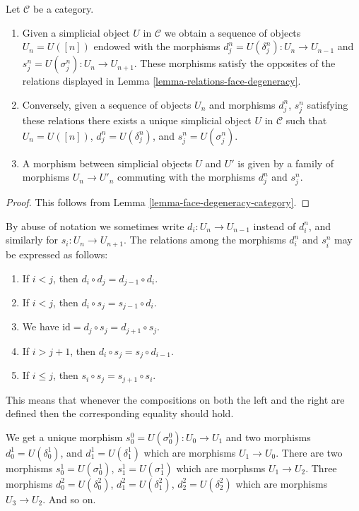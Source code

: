 \begin{lemma}
\label{lemma-characterize-simplicial-object}
Let $\mathcal{C}$ be a category.
\begin{enumerate}
\item Given a simplicial object $U$ in $\mathcal{C}$
we obtain a sequence of objects $U_n = U([n])$ endowed
with the morphisms $d^n_j = U(\delta^n_j) : U_n \to U_{n-1}$ and
$s^n_j = U(\sigma^n_j) : U_n \to U_{n + 1}$. These morphisms
satisfy the opposites of the relations displayed in
Lemma \ref{lemma-relations-face-degeneracy}.
\item Conversely, given a sequence of objects $U_n$ and morphisms
$d^n_j$, $s^n_j$ satisfying these relations there exists a unique
simplicial object $U$ in $\mathcal{C}$ such that $U_n = U([n])$,
$d^n_j = U(\delta^n_j)$, and $s^n_j = U(\sigma^n_j)$.
\item A morphism between simplicial objects $U$ and $U'$
is given by a family of morphisms $U_n \to U'_n$ commuting
with the morphisms $d^n_j$ and $s^n_j$.
\end{enumerate}
\end{lemma}

\begin{proof}
This follows from Lemma \ref{lemma-face-degeneracy-category}.
\end{proof}

\begin{remark}
\label{remark-relations}
By abuse of notation we sometimes write $d_i : U_n \to U_{n - 1}$
instead of $d^n_i$, and similarly for $s_i : U_n \to U_{n + 1}$.
The relations among the morphisms $d^n_i$ and $s^n_i$
may be expressed as follows:
\begin{enumerate}
\item If $i < j$, then $d_i \circ d_j = d_{j - 1} \circ d_i$.
\item If $i < j$, then $d_i \circ s_j = s_{j - 1} \circ d_i$.
\item We have $\text{id} = d_j \circ s_j = d_{j + 1} \circ s_j$.
\item If $i > j + 1$, then $d_i \circ s_j = s_j \circ d_{i - 1}$.
\item If $i \leq j$, then $s_i \circ s_j = s_{j + 1} \circ s_i$.
\end{enumerate}
This means that whenever the compositions on both the left and the
right are defined then the corresponding equality should hold.
\end{remark}

\noindent
We get a unique morphism $s^0_0 = U(\sigma^0_0) : U_0 \to U_1$ and
two morphisms $d^1_0 = U(\delta^1_0)$, and
$d^1_1 = U(\delta^1_1)$ which are morphisms $U_1 \to U_0$.
There are two morphisms $s^1_0 = U(\sigma^1_0)$, $s^1_1 = U(\sigma^1_1)$
which are morphsms $U_1 \to U_2$. Three morphisms
$d^2_0 = U(\delta^2_0)$, $d^2_1 = U(\delta^2_1)$, $d^2_2 = U(\delta^2_2)$
which are morphisms $U_3 \to U_2$. And so on.

